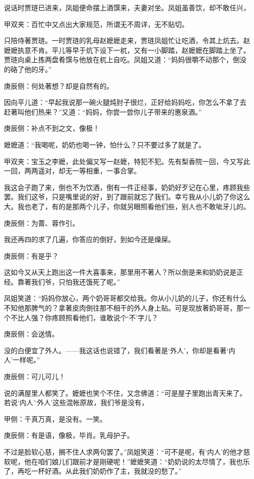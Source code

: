 \begin{parag}
    说话时贾琏已进来，凤姐便命摆上酒馔来，夫妻对坐。凤姐虽善饮，却不敢任兴，\begin{note}甲双夹：百忙中又点出大家规范，所谓无不周详，无不贴切。\end{note}只陪侍著贾琏。一时贾琏的乳母赵嬷嬷走来，贾琏凤姐忙让吃酒，令其上炕去。赵嬷嬷执意不肯。平儿等早于炕下设下一杌，又有一小脚踏，赵嬷嬷在脚踏上坐了。贾琏向桌上拣两盘肴馔与他放在杌上自吃。凤姐又道：“妈妈很嚼不动那个，倒没的硌了他的牙。”\begin{note}庚辰侧：何处著想？却是自然有的。\end{note}因向平儿道：“早起我说那一碗火腿炖肘子很烂，正好给妈妈吃，你怎么不拿了去赶著叫他们热来？”又道：“妈妈，你尝一尝你儿子带来的惠泉酒。”\begin{note}庚辰侧：补点不到之文，像极！\end{note}嬷嬷道：“我喝呢，奶奶也喝一钟，怕什么？只不要过多了就是了。\begin{note}甲双夹：宝玉之李嬷，此处偏又写一赵嬷，特犯不犯。先有梨香院一回，今又写此一回，两两遥对，却无一等相重，一事合掌。\end{note}我这会子跑了来，倒也不为饮酒，倒有一件正经事，奶奶好歹记在心里，疼顾我些罢。我们这爷，只是嘴里说的好，到了跟前就忘了我们。幸亏我从小儿奶了你这么大。我也老了，有的是那两个儿子，你就另眼照看他们些，别人也不敢呲牙儿的。\begin{note}庚辰侧：为蔷、蓉作引。\end{note}我还再四的求了几遍，你答应的倒好，到如今还是燥屎。\begin{note}庚辰侧：有是乎？\end{note}这如今又从天上跑出这一件大喜事来，那里用不著人？所以倒是来和奶奶说是正经。靠著我们爷，只怕我还饿死了呢。”
\end{parag}


\begin{parag}
    凤姐笑道：“妈妈你放心，两个奶哥哥都交给我。你从小儿奶的儿子，你还有什么不知他那脾气的？拿著皮肉倒往那不相干的外人身上贴。可是现放著奶哥哥，那一个不比人强？你疼顾照看他们，谁敢说个‘不’字儿？\begin{note}庚辰侧：会送情。\end{note}没的白便宜了外人。——我这话也说错了，我们看著是‘外人’，你却是看著‘内人’一样呢。”\begin{note}庚辰侧：可儿可儿！\end{note}说的满屋里人都笑了。嬷嬷也笑个不住，又念佛道：“可是屋子里跑出青天来了。若说‘内人’‘外人’这些混帐原故，我们爷是没有，\begin{note}甲侧：千真万真，是没有。一笑。\end{note}\begin{note}庚辰侧：有是语，像极，毕肖。乳母护子。\end{note}不过是脸软心慈，搁不住人求两句罢了。”凤姐笑道：“可不是呢，有‘内人’的他才慈软呢，他在咱们娘儿们跟前才是刚硬呢！”嬷嬷笑道：“奶奶说的太尽情了，我也乐了，再吃一杯好酒。从此我们奶奶作了主，我就没的愁了。”
\end{parag}


